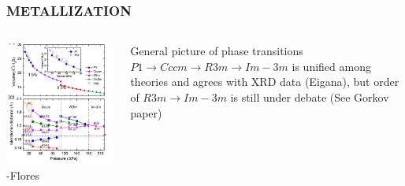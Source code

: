 \documentclass[amssymb,amsmath]{beamer}
\begin{document}
\begin{frame}
\frametitle{METALLIZATION}
\begin{columns}\begin{column}{0.5\textwidth}
\includegraphics[scale=0.39]{./figures/transitions_flores.png}\\
-Flores
\end{column}
\begin{column}{0.45\textwidth}
General picture of phase transitions $P1\rightarrow Cccm\rightarrow R3m\rightarrow Im-3m$ is unified among theories and agrees with XRD data (Eigana), but order of  $R3m\rightarrow Im-3m$ is still under debate (See Gorkov paper)
\end{column}\end{columns}
\end{frame}
\end{document}
